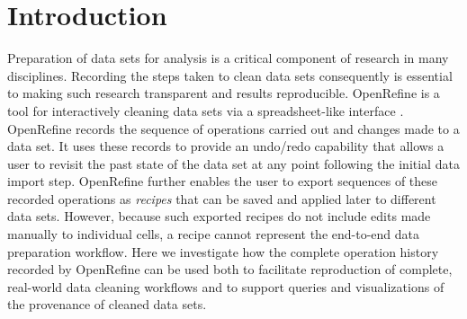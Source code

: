\section{Introduction}

Preparation of data sets for analysis is a critical component of research in many disciplines. Recording the steps taken to clean data sets consequently is essential to making such research transparent and results reproducible. OpenRefine is a tool for interactively cleaning data sets via a spreadsheet-like interface \cite{verborgh_using_2013}. OpenRefine records the sequence of operations carried out and changes made to a data set. It uses these records to provide an undo/redo capability that allows a user to revisit the past state of the data set at any point following the initial data import step. OpenRefine further enables the user to export sequences of these recorded operations as \emph{recipes} that can be saved and applied later to different data sets.  However, because such exported recipes do not include edits made manually to individual cells, a recipe cannot represent the end-to-end data preparation workflow. Here we investigate how the complete operation history recorded by OpenRefine can be used both to facilitate reproduction of complete, real-world data cleaning workflows and to support queries and visualizations of the provenance of cleaned data sets.

